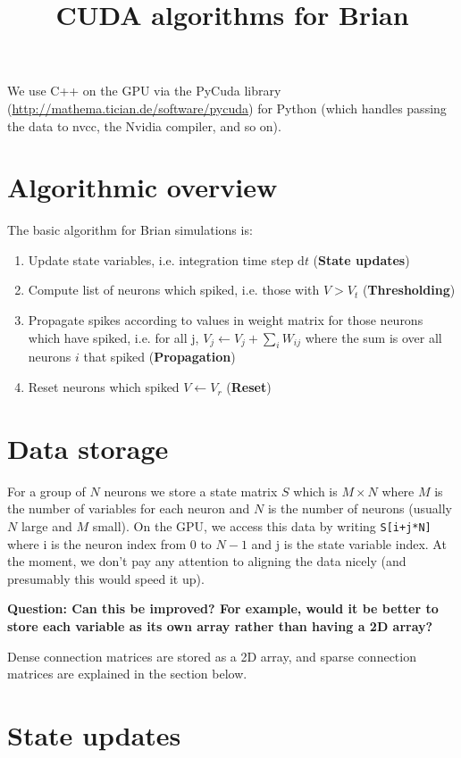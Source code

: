 \documentclass[a4paper]{article}
\title{CUDA algorithms for Brian}
\date{}
\newcommand{\ud}{\mathrm{d}}
\newcommand{\dt}{\ud t}
\newcommand{\question}[1]{\textbf{Question: #1}}
\begin{document}
\maketitle

We use C++ on the GPU via the PyCuda library (\url{http://mathema.tician.de/software/pycuda}) for Python (which handles passing the data to nvcc, the Nvidia compiler, and so on).

\section{Algorithmic overview}

The basic algorithm for Brian simulations is:

\begin{enumerate}
\item Update state variables, i.e. integration time step $\dt$ (\textbf{State updates})
\item Compute list of neurons which spiked, i.e. those with $V>V_t$ (\textbf{Thresholding})
\item Propagate spikes according to values in weight matrix for those neurons which have spiked, i.e. for all j, $V_j \leftarrow V_j + \sum_{i} W_{ij}$ where the sum is over all neurons $i$ that spiked (\textbf{Propagation})
\item Reset neurons which spiked $V\leftarrow V_r$ (\textbf{Reset})
\end{enumerate}

\section{Data storage}

For a group of $N$ neurons we store a state matrix $S$ which is $M\times N$ where $M$ is the number of variables for each neuron and $N$ is the number of neurons (usually $N$ large and $M$ small). On the GPU, we access this data by writing \lstinline$S[i+j*N]$ where i is the neuron index from 0 to $N-1$ and j is the state variable index. At the moment, we don't pay any attention to aligning the data nicely (and presumably this would speed it up).

\question{Can this be improved? For example, would it be better to store each variable as its own array rather than having a 2D array?}

Dense connection matrices are stored as a 2D array, and sparse connection matrices are explained in the section below.

\section{State updates}
\end{document}
